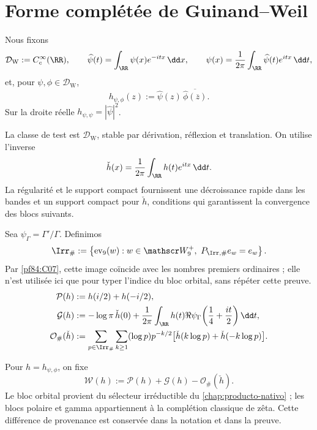 \section{Forme complétée de Guinand--Weil}

Nous fixons
\[
 \mathcal D_{\mathrm W}:=C_c^\infty(\RR),
 \qquad
 \widehat\psi(t)=\int_{\RR}\psi(x)e^{-itx}\,\dd x,
 \qquad
 \psi(x)=\frac1{2\pi}\int_{\RR}\widehat\psi(t)e^{itx}\,\dd t,
\]
et, pour \(\psi,\phi\in\mathcal D_{\mathrm W}\),
\[
 h_{\psi,\phi}(z)
 :=\widehat\psi(z)\,
 \overline{\widehat\phi(\overline z)}.
\]
Sur la droite réelle \(h_{\psi,\psi}=|\widehat\psi|^2\).

\begin{definition}
\label{pf84:E01}
La classe de test est \(\mathcal D_{\mathrm W}\), stable par dérivation,
réflexion et translation. On utilise l'inverse
\[
 \check h(x)=\frac1{2\pi}\int_{\RR}h(t)e^{itx}\,\dd t.
\]
La régularité et le support compact fournissent une décroissance rapide dans les bandes
et un support compact pour \(\check h\), conditions qui garantissent la
convergence des blocs suivants.
\end{definition}

Sea \(\psi_\Gamma=\Gamma'/\Gamma\). Definimos
\[
 \Irr_\#:=
 \left\{\operatorname{ev}_9(w):
 w\in\mathscr W_9^+,\ 
 P_{\Irr,\#}e_w=e_w\right\}.
\]
Par \cref{pf84:C07}, cette image coïncide avec les nombres premiers ordinaires ; elle n'est
utilisée ici que pour typer l'indice du bloc orbital, sans répéter cette
preuve.
\begin{align}
 \mathcal P(h)&:=h(i/2)+h(-i/2),\\
 \mathcal G(h)&:=-\log\pi\,\check h(0)
 +\frac1{2\pi}\int_{\RR}h(t)
 \Re\psi_\Gamma\!\left(\frac14+\frac{it}{2}\right)\dd t,\\
 \mathcal O_\#(\check h)&:=
 \sum_{p\in\Irr_\#}\sum_{k\ge1}
 (\log p)p^{-k/2}
 \bigl[\check h(k\log p)+\check h(-k\log p)\bigr].
\end{align}

\begin{definition}
\label{pf84:E02}
Pour \(h=h_{\psi,\phi}\), on fixe
\[
 \mathcal W(h):=\mathcal P(h)+\mathcal G(h)
 -\mathcal O_\#(\check h).
\]
Le bloc orbital provient du sélecteur irréductible du
\cref{chap:producto-nativo} ; les blocs polaire et gamma appartiennent à la
complétion classique de zêta. Cette différence de provenance est conservée dans
la notation et dans la preuve.
\end{definition}

